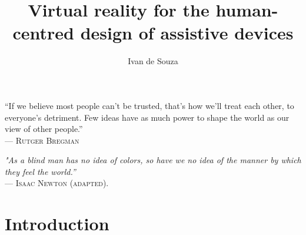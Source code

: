 \documentclass[msc, dv, eng]{ita}    %
\author{Ivan de Souza}{Rehder}
\title{Virtual reality for the human-centred design of assistive devices}
\date{}{}{}
\begin{document}

\begin{itadedication}
    “If we believe most people can't be trusted, that's how we'll treat each other, to everyone's detriment. Few ideas have as much power to shape the world as our view of other people.”\\
    --- \textsc{Rutger Bregman}
\end{itadedication}

\begin{itathanks}

\end{itathanks}

\thispagestyle{empty}
\ifhyperref{}\fi
\begin{flushright}
\begin{spacing}{1}
\mbox{}\vfill
{\sffamily\itshape
"As a blind man has no idea of colors, so have we no idea of the manner by which they feel the world.”\\}
--- \textsc{Isaac Newton (adapted).}
\end{spacing}
\end{flushright}

% 

\begin{englishabstract}
\noindent

\end{englishabstract}






\mainmatter

\chapter{Introduction}
\label{ch:introducao}

\end{document}

